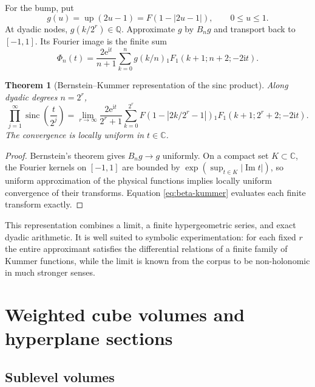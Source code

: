 \documentclass[11pt,oneside]{article}
\newtheorem{theorem}{Theorem}[section]
\theoremstyle{definition}
\theoremstyle{remark}
\newcommand{\C}{\mathbb C}
\newcommand{\Q}{\mathbb Q}
\newcommand{\Up}{\operatorname{up}}
\newcommand{\sinc}{\operatorname{sinc}}
\newcommand{\ii}{\mathrm i}
\newcommand{\e}{\mathrm e}
\newcommand{\1}{\mathbf 1}
\begin{document}
For the bump, put
\begin{equation}
 g(u)=\Up(2u-1)=F(1-|2u-1|),\qquad 0\le u\le1.           \label{eq:g-up}
\end{equation}
At dyadic nodes, $g(k/2^r)\in\Q$.  Approximate $g$ by $B_ng$ and transport
back to $[-1,1]$.  Its Fourier image is the finite sum
\begin{equation}
 \Phi_n(t)=\frac{2\e^{\ii t}}{n+1}
 \sum_{k=0}^{n}g(k/n)
 {}_1F_1(k+1;n+2;-2\ii t).                              \label{eq:up-bernstein-kummer-finite}
\end{equation}

\begin{theorem}[Bernstein--Kummer representation of the sinc product]
\label{thm:bernstein-kummer}
Along dyadic degrees $n=2^r$,
\begin{equation}
 \boxed{\displaystyle
 \prod_{j=1}^\infty\sinc\!\left(\frac{t}{2^j}\right)
 =\lim_{r\to\infty}
 \frac{2\e^{\ii t}}{2^r+1}
 \sum_{k=0}^{2^r}F(1-|2k/2^r-1|)
 {}_1F_1(k+1;2^r+2;-2\ii t).}                           \label{eq:bernstein-kummer-limit}
\end{equation}
The convergence is locally uniform in $t\in\C$.
\end{theorem}

\begin{proof}
Bernstein's theorem gives $B_ng\to g$ uniformly.  On a compact set
$K\subset\C$, the Fourier kernels on $[-1,1]$ are bounded by
$\exp(\sup_{t\in K}|\operatorname{Im}t|)$, so uniform approximation of the
physical functions implies locally uniform convergence of their transforms.
Equation \eqref{eq:beta-kummer} evaluates each finite transform exactly.
\end{proof}

This representation combines a limit, a finite hypergeometric series, and
exact dyadic arithmetic.  It is well suited to symbolic experimentation:
for each fixed $r$ the entire approximant satisfies the differential
relations of a finite family of Kummer functions, while the limit is known
from the corpus to be non-holonomic in much stronger senses.

\section{Weighted cube volumes and hyperplane sections}
\label{sec:cube}

\subsection{Sublevel volumes}
\end{document}

